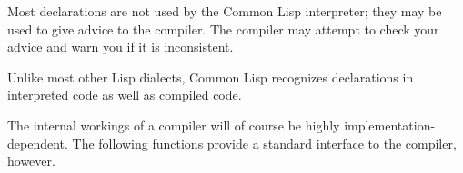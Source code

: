 Most declarations are not used by the Common Lisp interpreter;
they may be used to give advice to the compiler.  The compiler may attempt
to check your advice and warn you if it is inconsistent.


Unlike most other Lisp dialects, Common Lisp recognizes 
declarations in interpreted code as well as compiled code.


The internal workings of a compiler will of course be highly
implementation-dependent.  The following functions provide a standard
interface to the compiler, however.


